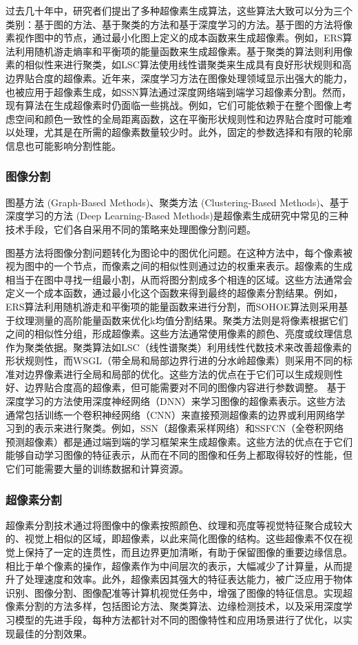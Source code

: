 过去几十年中，研究者们提出了多种超像素生成算法，这些算法大致可以分为三个类别：基于图的方法、基于聚类的方法和基于深度学习的方法。基于图的方法将像素视作图中的节点，通过最小化图上定义的成本函数来生成超像素。例如，ERS算法利用随机游走熵率和平衡项的能量函数来生成超像素。基于聚类的算法则利用像素的相似性来进行聚类，如LSC算法使用线性谱聚类来生成具有良好形状规则和高边界贴合度的超像素。近年来，深度学习方法在图像处理领域显示出强大的能力，也被应用于超像素生成，如SSN算法通过深度网络端到端学习超像素分割。然而，现有算法在生成超像素时仍面临一些挑战。例如，它们可能依赖于在整个图像上考虑空间和颜色一致性的全局距离函数，这在平衡形状规则性和边界贴合度时可能难以处理，尤其是在所需的超像素数量较少时。此外，固定的参数选择和有限的轮廓信息也可能影响分割性能。\cite{贾耕云2018基于超像素的}

\subsubsection{图像分割}
图基方法 (Graph-Based Methods)、聚类方法 (Clustering-Based Methods)、基于深度学习的方法 (Deep Learning-Based Methods)是超像素生成研究中常见的三种技术手段，它们各自采用不同的策略来处理图像分割问题。

图基方法将图像分割问题转化为图论中的图优化问题。在这种方法中，每个像素被视为图中的一个节点，而像素之间的相似性则通过边的权重来表示。超像素的生成相当于在图中寻找一组最小割，从而将图分割成多个相连的区域。这些方法通常会定义一个成本函数，通过最小化这个函数来得到最终的超像素分割结果。例如，ERS算法利用随机游走和平衡项的能量函数来进行分割，而SOHOE算法则采用基于纹理测量的高阶能量函数来优化k均值分割结果。聚类方法则是将像素根据它们之间的相似性分组，形成超像素。这些方法通常使用像素的颜色、亮度或纹理信息作为聚类依据。聚类算法如LSC（线性谱聚类）利用线性代数技术来改善超像素的形状规则性，而WSGL（带全局和局部边界行进的分水岭超像素）则采用不同的标准对边界像素进行全局和局部的优化。\cite{JSJA2022S2084}这些方法的优点在于它们可以生成规则性好、边界贴合度高的超像素，但可能需要对不同的图像内容进行参数调整。
基于深度学习的方法使用深度神经网络（DNN）来学习图像的超像素表示。这些方法通常包括训练一个卷积神经网络（CNN）来直接预测超像素的边界或利用网络学习到的表示来进行聚类。例如，SSN（超像素采样网络）和SSFCN（全卷积网络预测超像素）都是通过端到端的学习框架来生成超像素。这些方法的优点在于它们能够自动学习图像的特征表示，从而在不同的图像和任务上都取得较好的性能，但它们可能需要大量的训练数据和计算资源。

\subsubsection{超像素分割}
超像素分割技术通过将图像中的像素按照颜色、纹理和亮度等视觉特征聚合成较大的、视觉上相似的区域，即超像素，以此来简化图像的结构。这些超像素不仅在视觉上保持了一定的连贯性，而且边界更加清晰，有助于保留图像的重要边缘信息。相比于单个像素的操作，超像素作为中间层次的表示，大幅减少了计算量，从而提升了处理速度和效率。此外，超像素因其强大的特征表达能力，被广泛应用于物体识别、图像分割、图像配准等计算机视觉任务中，增强了图像的特征信息。实现超像素分割的方法多样，包括图论方法、聚类算法、边缘检测技术，以及采用深度学习模型的先进手段，每种方法都针对不同的图像特性和应用场景进行了优化，以实现最佳的分割效果。

